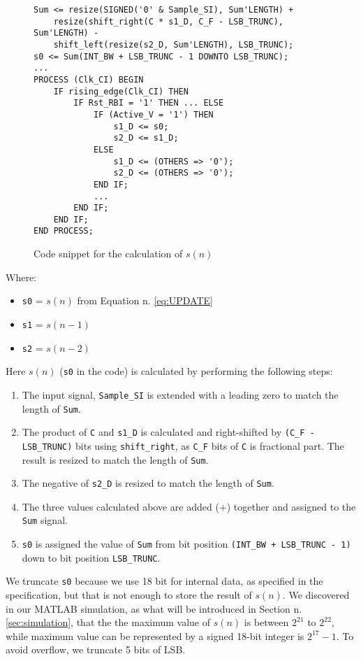 \lstset{language=VHDL}
\begin{figure}[H]\begin{lstlisting}
Sum <= resize(SIGNED('0' & Sample_SI), Sum'LENGTH) +
    resize(shift_right(C * s1_D, C_F - LSB_TRUNC), Sum'LENGTH) -
    shift_left(resize(s2_D, Sum'LENGTH), LSB_TRUNC);
s0 <= Sum(INT_BW + LSB_TRUNC - 1 DOWNTO LSB_TRUNC);
...
PROCESS (Clk_CI) BEGIN
    IF rising_edge(Clk_CI) THEN
        IF Rst_RBI = '1' THEN ... ELSE
            IF (Active_V = '1') THEN
                s1_D <= s0;
                s2_D <= s1_D;
            ELSE
                s1_D <= (OTHERS => '0');
                s2_D <= (OTHERS => '0');
            END IF;
            ...
        END IF;
    END IF;
END PROCESS;
\end{lstlisting}
\caption{Code snippet for the calculation of $s(n)$}
\end{figure}
Where:
\begin{itemize}
    \item \texttt{s0} = $s(n)$ from Equation n. \ref{eq:UPDATE}
    \item \texttt{s1} = $s(n-1)$ 
    \item \texttt{s2} = $s(n-2)$
\end{itemize}
Here $s(n)$ (\texttt{s0} in the code) is calculated by performing the following steps:
\begin{enumerate}
    \item The input signal, \texttt{Sample\_SI} is extended with a leading zero to match the length of \texttt{Sum}.
    \item The product of \texttt{C} and \texttt{s1\_D} is calculated and right-shifted by \texttt{(C\_F - LSB\_TRUNC)} bits using \texttt{shift\_right}, as \texttt{C\_F} bits of \texttt{C} is fractional part. The result is resized to match the length of \texttt{Sum}.
    \item The negative of \texttt{s2\_D} is resized to match the length of \texttt{Sum}.
    \item The three values calculated above are added (+) together and assigned to the \texttt{Sum} signal.
    \item \texttt{s0} is assigned the value of \texttt{Sum} from bit position \texttt{(INT\_BW + LSB\_TRUNC - 1)} down to bit position \texttt{LSB\_TRUNC}.
\end{enumerate}

We truncate \texttt{s0} because we use 18 bit for internal data, as specified in the specification, but that is not enough to store the result of $s(n)$. We discovered in our MATLAB simulation, as what will be introduced in Section n. \ref{sec:simulation}, that the the maximum value of $s(n)$ is between $2^{21}$ to $2^{22}$, while maximum value can be represented by a signed 18-bit integer is $2^{17} - 1$. To avoid overflow, we truncate 5 bits of LSB.

